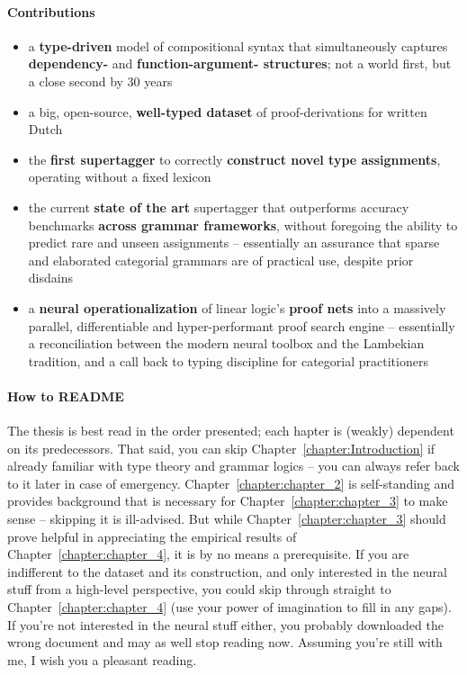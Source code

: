 {\paragraph{Contributions}
\begin{itemize}
\item a \textbf{type-driven} model of compositional syntax that simultaneously captures \textbf{dependency-} and \textbf{function-argument- structures}; not a world first, but a close second by 30 years
\item a big, open-source, \textbf{well-typed dataset} of proof-derivations for written Dutch
\item the \textbf{first supertagger} to correctly \textbf{construct novel type assignments}, operating without a fixed lexicon
\item the current \textbf{state of the art} supertagger that outperforms accuracy benchmarks \textbf{across grammar frameworks}, without foregoing the ability to predict rare and unseen assignments -- essentially an assurance that sparse and elaborated categorial grammars are of practical use, despite prior disdains
\item a \textbf{neural operationalization} of linear logic's \textbf{proof nets} into a massively parallel, differentiable and hyper-performant proof search engine -- essentially a reconciliation between the modern neural toolbox and the Lambekian tradition, and a call back to typing discipline for categorial practitioners
\end{itemize}

\paragraph{How to README}
The thesis is best read in the order presented; each hapter is (weakly) dependent on its predecessors.
That said, you can skip Chapter~\ref{chapter:Introduction} if already familiar with type theory and grammar logics -- you can always refer back to it later in case of emergency.
Chapter~\ref{chapter:chapter_2} is self-standing and provides background that is necessary for Chapter~\ref{chapter:chapter_3} to make sense -- skipping it is ill-advised.
But while Chapter~\ref{chapter:chapter_3} should prove helpful in appreciating the empirical results of Chapter~\ref{chapter:chapter_4}, it is by no means a prerequisite.
If you are indifferent to the dataset and its construction, and only interested in the neural stuff from a high-level perspective, you could skip through straight to Chapter~\ref{chapter:chapter_4} (use your power of imagination to fill in any gaps).
If you're not interested in the neural stuff either, you probably downloaded the wrong document and may as well stop reading now.
Assuming you're still with me, I wish you a pleasant reading.

}
